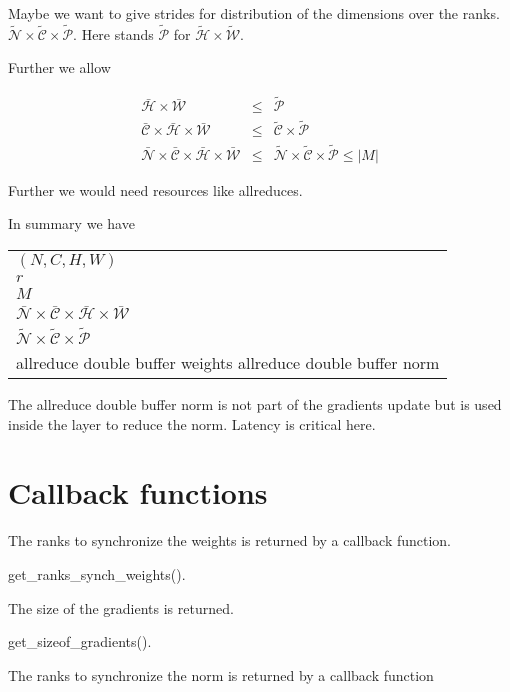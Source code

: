 \documentclass{report}
\begin{document}
Maybe we want to give strides for distribution of the dimensions over the
ranks.
$\tilde{\mathcal{N}} \times \tilde{\mathcal{C}} \times \tilde{\mathcal{P}}$.
Here stands
$ \tilde{\mathcal{P}}$ for $\tilde{\mathcal{H}} \times \tilde{\mathcal{W}}$.

Further we allow

\begin{eqnarray}
  \bar{\mathcal{H}} \times \bar{\mathcal{W}} & \leq & \tilde{\mathcal{P}}\\
    \bar{\mathcal{C}} \times  \bar{\mathcal{H}} \times \bar{\mathcal{W}}
  & \leq &
  \tilde{\mathcal{C}} \times  \tilde{\mathcal{P}}
  \\
     \bar{\mathcal{N}} \times \bar{\mathcal{C}} \times  \bar{\mathcal{H}} \times \bar{\mathcal{W}}
  & \leq &
   \tilde{\mathcal{N}} \times \tilde{\mathcal{C}} \times  \tilde{\mathcal{P}}
   \leq |M|
\end{eqnarray}


Further we would need resources like allreduces.

In summary we have

\begin{tabular}{l}
  $(N, C, H, W)$ \\
  $r$ \\
  $M$ \\
  $\bar{\mathcal{N}} \times \bar{\mathcal{C}} \times \bar{\mathcal{H}} \times
  \bar{\mathcal{W}}$\\
$\tilde{\mathcal{N}} \times \tilde{\mathcal{C}} \times \tilde{\mathcal{P}}$\\
  allreduce double buffer weights
  allreduce double buffer norm
\end{tabular}

The allreduce double buffer norm is not part of the gradients update but
is used inside the layer to reduce the norm. Latency is critical here.

\section{Callback functions}

The ranks to synchronize the weights is returned by a callback function.

get\_ranks\_synch\_weights().

The size of the gradients is returned.

get\_sizeof\_gradients().

The ranks to synchronize the norm is returned by a callback function
\end{document}
